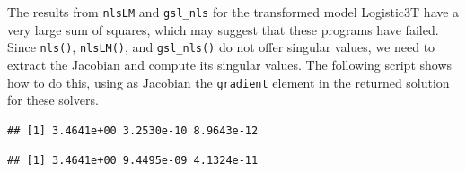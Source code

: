\documentclass[
]{article}
\newenvironment{Shaded}{\begin{snugshade}}{\end{snugshade}}
\newcommand{\CommentTok}[1]{\textcolor[rgb]{0.56,0.35,0.01}{\textit{#1}}}
\newcommand{\ControlFlowTok}[1]{\textcolor[rgb]{0.13,0.29,0.53}{\textbf{#1}}}
\newcommand{\FunctionTok}[1]{\textcolor[rgb]{0.13,0.29,0.53}{\textbf{#1}}}
\newcommand{\NormalTok}[1]{#1}
\newcommand{\OtherTok}[1]{\textcolor[rgb]{0.56,0.35,0.01}{#1}}
\newcommand{\SpecialCharTok}[1]{\textcolor[rgb]{0.81,0.36,0.00}{\textbf{#1}}}
\newcommand{\StringTok}[1]{\textcolor[rgb]{0.31,0.60,0.02}{#1}}
\begin{document}
The results from \texttt{nlsLM} and \texttt{gsl\_nls} for the
transformed model Logistic3T have a very large sum of squares, which may
suggest that these programs have failed. Since \texttt{nls()},
\texttt{nlsLM()}, and \texttt{gsl\_nls()} do not offer singular values,
we need to extract the Jacobian and compute its singular values. The
following script shows how to do this, using as Jacobian the
\texttt{gradient} element in the returned solution for these solvers.

\begin{Shaded}
\end{Shaded}

\begin{verbatim}
## [1] 3.4641e+00 3.2530e-10 8.9643e-12
\end{verbatim}

\begin{Shaded}
\end{Shaded}

\begin{verbatim}
## [1] 3.4641e+00 9.4495e-09 4.1324e-11
\end{verbatim}
\end{document}
